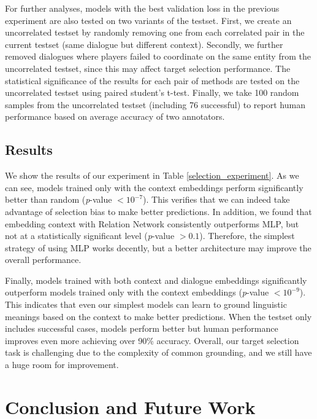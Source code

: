 \documentclass[letterpaper]{article} %
\begin{document}
For further analyses, models with the best validation loss in the previous experiment are also tested on two variants of the testset. First, we create an uncorrelated testset by randomly removing one from each correlated pair in the current testset (same dialogue but different context). Secondly, we further removed dialogues where players failed to coordinate on the same entity from the uncorrelated testset, since this may affect target selection performance. The statistical significance of the results for each pair of methods are tested on the uncorrelated testset using paired student's t-test. Finally, we take 100 random samples from the uncorrelated testset (including 76 successful) to report human performance based on average accuracy of two annotators.

\vspace{-2.43mm}
\subsection{Results}

We show the results of our experiment in Table \ref{selection_experiment}. As we can see, models trained only with the context embeddings perform significantly better than random (\textit{p}-value $<10^{-7}$). This verifies that we can indeed take advantage of selection bias to make better predictions.  In addition, we found that embedding context with Relation Network consistently outperforms MLP, but not at a statistically significant level (\textit{p}-value $>0.1$). Therefore, the simplest strategy of using MLP works decently, but a better architecture may improve the overall performance.

Finally, models trained with both context and dialogue embeddings significantly outperform models trained only with the context embeddings (\textit{p}-value $<10^{-9}$). This indicates that even our simplest models can learn to ground linguistic meanings based on the context to make better predictions. When the testset only includes successful cases, models perform better but human performance improves even more achieving over 90\% accuracy. Overall, our target selection task is challenging due to the complexity of common grounding, and we still have a huge room for improvement.

\vspace{-1.60mm}
\section{Conclusion and Future Work}
\label{section:conclusion}
\end{document}
